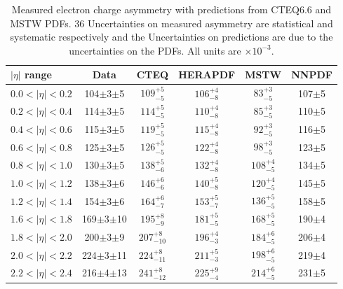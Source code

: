 \begin{table}[htbp]
\begin{center}
\begin{tabular}{lccccc}
\toprule
$|\eta|$ range  & Data & CTEQ & HERAPDF & MSTW & NNPDF \\ \midrule
  $0.0<|\eta|<0.2$ &104$\pm$3$\pm$5 &$109^{+5}_{-5}$ &$106^{+4}_{-8}$ & $83^{+3}_{-5}$& 107$\pm$5\\
  $0.2<|\eta|<0.4$ &114$\pm$3$\pm$5 &$114^{+5}_{-5}$ &$110^{+4}_{-8}$ & $85^{+3}_{-5}$& 110$\pm$5\\
  $0.4<|\eta|<0.6$ &115$\pm$3$\pm$5 &$119^{+5}_{-5}$ &$115^{+4}_{-8}$ & $92^{+3}_{-5}$& 116$\pm$5\\
  $0.6<|\eta|<0.8$ &125$\pm$3$\pm$5 &$126^{+5}_{-5}$ &$122^{+4}_{-8}$ & $98^{+3}_{-5}$& 123$\pm$5\\
  $0.8<|\eta|<1.0$ &130$\pm$3$\pm$5 &$138^{+5}_{-6}$ &$132^{+4}_{-8}$ & $108^{+4}_{-5}$& 134$\pm$5\\
  $1.0<|\eta|<1.2$ &138$\pm$3$\pm$6 &$146^{+6}_{-6}$ &$140^{+5}_{-8}$ & $120^{+4}_{-5}$&145$\pm$5 \\
  $1.2<|\eta|<1.4$ &154$\pm$3$\pm$6 &$164^{+6}_{-7}$ &$153^{+5}_{-7}$ & $136^{+5}_{-5}$&158$\pm$5 \\
  $1.6<|\eta|<1.8$ &169$\pm$3$\pm$10 &$195^{+8}_{-9}$ &$181^{+5}_{-5}$ & $168^{+5}_{-5}$&190$\pm$4 \\
  $1.8<|\eta|<2.0$ &200$\pm$3$\pm$9 &$207^{+8}_{-10}$ &$196^{+4}_{-3}$ & $184^{+6}_{-5}$&206$\pm$4 \\
  $2.0<|\eta|<2.2$ &224$\pm$3$\pm$11 &$224^{+8}_{-11}$ &$211^{+5}_{-3}$ & $198^{+6}_{-5}$&219$\pm$4 \\
  $2.2<|\eta|<2.4$ &216$\pm$4$\pm$13 &$241^{+8}_{-12}$ &$225^{+9}_{-4}$ & $214^{+6}_{-5}$&231$\pm$5 \\
\bottomrule
\end{tabular}
\caption{Measured electron charge asymmetry with predictions from CTEQ6.6 and
MSTW PDFs.  36 Uncertainties on measured asymmetry are statistical and
systematic respectively and the Uncertainties on predictions are due to the
uncertainties on the PDFs. All units are $\times 10^{-3}$.}
\label{tab:updatedresults}
\end{center}
\end{table}


